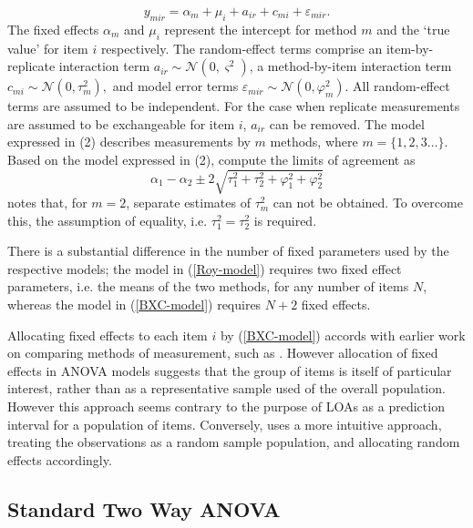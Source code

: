 \documentclass[12pt, a4paper]{report}
\theoremstyle{plain}
\theoremstyle{definition}
\theoremstyle{remark}
\begin{document}
	\begin{equation}\label{BXC-model}
	y_{mir}  = \alpha_{m} + \mu_{i} + a_{ir} + c_{mi} + \varepsilon_{mir}.
	\end{equation}
	The fixed effects $\alpha_{m}$ and $\mu_{i}$ represent the intercept for method $m$ and the `true value' for item $i$ respectively. The random-effect terms comprise an item-by-replicate interaction term $a_{ir} \sim \mathcal{N}(0,\varsigma^{2})$, a method-by-item interaction term $c_{mi} \sim \mathcal{N}(0,\tau^{2}_{m}),$ and model error terms $\varepsilon_{mir} \sim \mathcal{N}(0,\varphi^{2}_{m}).$ All random-effect terms are assumed to be independent. For the case when replicate measurements are assumed to be exchangeable for item $i$, $a_{ir}$ can be removed. The model expressed in (2) describes measurements by $m$ methods, where $m = \{1,2,3\ldots\}$. Based on the model expressed in (2), \citet{BXC2008} compute the limits of agreement as
	\[
	\alpha_1 - \alpha_2 \pm 2 \sqrt{ \tau^2_1 +  \tau^2_2 +  \varphi^2_1 +  \varphi^2_2 }
	\]
	\citet{BXC2008} notes that, for $m=2$,  separate estimates of $\tau^2_m$ can not be obtained. To overcome this, the assumption of equality, i.e. $\tau^2_1 = \tau^2_2$ is required.
	
	There is a substantial difference in the number of fixed parameters used by the respective models; the model in (\ref{Roy-model}) requires two fixed effect parameters, i.e. the means of the two methods, for any number of items $N$, whereas the model in (\ref{BXC-model}) requires $N+2$ fixed effects.
	
	Allocating fixed effects to each item $i$ by (\ref{BXC-model}) accords with earlier work on comparing methods of measurement, such as \citet{Grubbs48}. However allocation of fixed effects in ANOVA models suggests that the group of items is itself of particular interest, rather than as a representative sample used of the overall population. However this approach seems contrary to the purpose of LOAs as a prediction interval for a population of items. Conversely, \citet{roy}
	uses a more intuitive approach, treating the observations as a random sample population, and allocating random effects accordingly.
	
	
	\newpage
	
	\subsection{Standard Two Way ANOVA}
\end{document}
